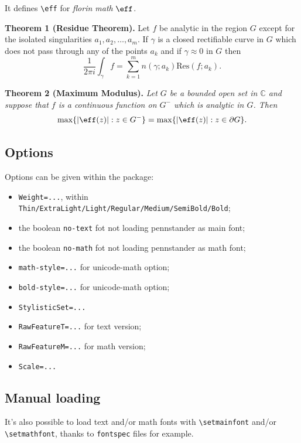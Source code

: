 \documentclass[a4paper]{scrartcl}
\newcommand*{\opt}[1]{\texttt{#1}}
\newcommand*{\cmd}[1]{\texttt{\textbackslash #1}}\newcommand*{\showtchar}[1]{\cmd{#1}~\csname #1\endcsname}
\begin{document}
It defines \cmd{eff} for \textit{florin math} $\eff$.

\begin{oframed}
\textbf{Theorem 1 (Residue Theorem).}
Let $f$ be analytic in the region $G$ except for the isolated singularities $a_1,a_2,\ldots,a_m$. If $\gamma$ is a closed rectifiable curve in $G$ which does not pass through any of the points $a_k$ and if $\gamma\approx 0$ in $G$ then
\[
\frac{1}{2\pi i}\int_\gamma f = \sum_{k=1}^m n(\gamma;a_k) \text{Res}(f;a_k).
\]

\textbf{Theorem 2 (Maximum Modulus).}
\emph{Let $G$ be a bounded open set in $\mathbb{C}$ and suppose that $f$ is a continuous function on $G^-$ which is analytic in $G$. Then}
\[
\max\{|\eff(z)|:z\in G^-\}=\max \{|\eff(z)|:z\in \partial G \}.
\]
\end{oframed}

\subsection{Options}

Options can be given within the package:

\begin{itemize}
	\item \opt{Weight=...}, within \opt{Thin/ExtraLight/Light/Regular/Medium/SemiBold/Bold};
	\item the boolean \opt{no-text} fot not loading pennstander as main font;
	\item the boolean \opt{no-math} fot not loading pennstander as math font;
	\item \opt{math-style=...} for unicode-math option;
	\item \opt{bold-style=...} for unicode-math option;
	\item \opt{StylisticSet=...}
	\item \opt{RawFeatureT=...} for text version;
	\item \opt{RawFeatureM=...} for math version;
	\item \opt{Scale=...}
\end{itemize}

\subsection{Manual loading}

It's also possible to load text and/or math fonts with \cmd{setmainfont} and/or \cmd{setmathfont}, thanks to \opt{fontspec} files for example.
\end{document}
